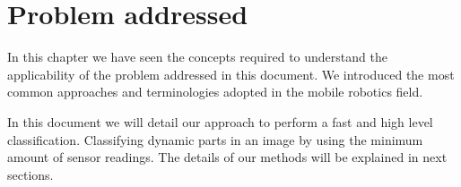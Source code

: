 \section{Problem addressed}

In this chapter we have seen the concepts required to understand the applicability of the problem addressed in this document. We introduced the most common approaches and terminologies adopted in the mobile robotics field. 

In this document we will detail our approach to perform a fast and high level classification. Classifying dynamic parts in an image by using the minimum amount of sensor readings. The details of our methods will be explained in next sections.

